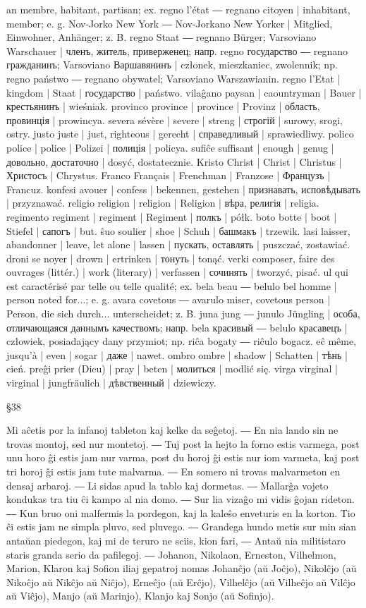 an membre, habitant, partisan; ex. regno l’état ― regnano citoyen | inhabitant, member; e. g. Nov-Jorko New York ― Nov-Jorkano New Yorker | Mitglied, Einwohner, Anhänger; z. B. regno Staat ― regnano Bürger; Varsoviano Warschauer | членъ, житель, приверженец; напр. regno государство ― regnano гражданинъ; Varsoviano Варшавянинъ | członek, mieszkaniec, zwolennik; np. regno państwo ― regnano obywatel; Varsoviano Warszawianin.
regno l’Etat | kingdom | Staat | государство | państwo.
vilaĝano paysan | caountryman | Bauer | крестьянинъ | wieśniak.
provinco province | province | Provinz | область, провинція | prowincya.
severa sévère | severe | streng | строгій | surowy, srogi, ostry.
justo juste | just, righteous | gerecht | справедливый | sprawiedliwy.
polico police | police | Polizei | полиція | policya.
sufiĉe suffisant | enough | genug | довольно, достаточно | dosyć, dostatecznie.
Kristo Christ | Christ | Christus | Христосъ | Chrystus.
Franco Français | Frenchman | Franzose | Французъ | Francuz.
konfesi avouer | confess | bekennen, gestehen | признавать, исповѣдывать | przyznawać.
religio religion | religion | Religion | вѣра, религія | religia.
regimento regiment | regiment | Regiment | полкъ | półk.
boto botte | boot | Stiefel | сапогъ | but.
ŝuo soulier | shoe | Schuh | башмакъ | trzewik.
lasi laisser, abandonner | leave, let alone | lassen | пускать, оставлять | puszczać, zostawiać.
droni se noyer | drown | ertrinken | тонуть | tonąć.
verki composer, faire des ouvrages (littér.) | work (literary) | verfassen | сочинять | tworzyć, pisać.
ul qui est caractérisé par telle ou telle qualité; ex. bela beau ― belulo bel homme | person noted for...; e. g. avara covetous ― avarulo miser, covetous person | Person, die sich durch... unterscheidet; z. B. juna jung ― junulo Jüngling | особа, отличающаяся даннымъ качествомъ; напр. bela красивый ― belulo красавецъ | człowiek, posiadający dany przymiot; np. riĉa bogaty ― riĉulo bogacz.
eĉ même, jusqu’à | even | sogar | даже | nawet.
ombro ombre | shadow | Schatten | тѣнь | cień.
preĝi prier (Dieu) | pray | beten | молиться | modlić się.
virga virginal | virginal | jungfräulich | дѣвственный | dziewiczy.

§38

Mi aĉetis por la infanoj tableton kaj kelke da seĝetoj. ― En nia lando sin ne trovas montoj, sed nur montetoj. ― Tuj post la hejto la forno estis varmega, post unu horo ĝi estis jam nur varma, post du horoj ĝi estis nur iom varmeta, kaj post tri horoj ĝi estis jam tute malvarma. ― En somero ni trovas malvarmeton en densaj arbaroj. ― Li sidas apud la tablo kaj dormetas. ― Mallarĝa vojeto kondukas tra tiu ĉi kampo al nia domo. ― Sur lia vizaĝo mi vidis ĝojan rideton. ― Kun bruo oni malfermis la pordegon, kaj la kaleŝo enveturis en la korton. Tio ĉi estis jam ne simpla pluvo, sed pluvego. ― Grandega hundo metis sur min sian antaŭan piedegon, kaj mi de teruro ne sciis, kion fari, ― Antaŭ nia militistaro staris granda serio da pafilegoj. ― Johanon, Nikolaon, Erneston, Vilhelmon, Marion, Klaron kaj Sofion iliaj gepatroj nomas Johanĉjo (aŭ Joĉjo), Nikolĉjo (aŭ Nikoĉjo aŭ Nikĉjo aŭ Niĉjo), Erneĉjo (aŭ Erĉjo), Vilhelĉjo (aŭ Vilheĉjo aŭ Vilĉjo aŭ Viĉjo), Manjo (aŭ Marinjo), Klanjo kaj Sonjo (aŭ Sofinjo).


